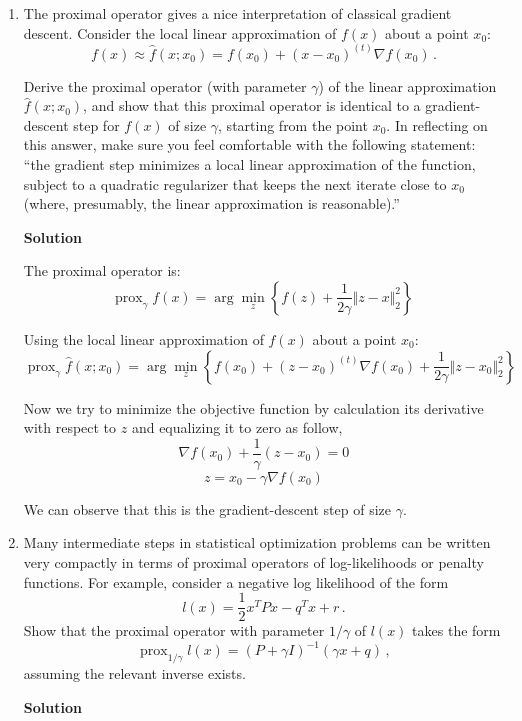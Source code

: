\documentclass[11 pt]{article}
\newcommand{\prox}{ \mathop{\mathrm{prox}} }
\newcommand{\enorm}[1]{\Vert #1 \Vert_2}
\begin{document}
	\begin{enumerate}[label=(\Alph*)]
		\item
		The proximal operator gives a nice interpretation of classical gradient descent.  Consider the local linear approximation of $f(x)$ about a point $x_0$:
		$$
		f(x) \approx \hat{f}(x; x_0) = f(x_0) + (x - x_0)^{(t)} \nabla f(x_0) \, .
		$$
		
		Derive the proximal operator (with parameter $\gamma$) of the linear approximation $\hat{f}(x; x_0)$, and show that this proximal operator is identical to a gradient-descent step for $f(x)$ of size $\gamma$, starting from the point $x_0$.  In reflecting on this answer, make sure you feel comfortable with the following statement: ``the gradient step minimizes a local linear approximation of the function, subject to a quadratic regularizer that keeps the next iterate close to $x_0$ (where, presumably, the linear approximation is reasonable).''
		
		\vspace{2mm}
		\textbf{Solution}
		
		The proximal operator is:
		$$
			\prox_{\gamma} f(x) = \arg \min_{z } \left\{  f(z)+ \frac{1}{2\gamma} \enorm{z - x}^2  \right\} \
		$$
		
		Using the local linear approximation of $f(x)$ about a point $x_0$:
		$$ 			\prox_{\gamma} \hat{f}(x; x_0) = \arg \min_{z } \left\{  f(x_0) + (z - x_0)^{(t)} \nabla f(x_0)+ \frac{1}{2\gamma} \enorm{z - x_0}^2  \right\} 	$$
		
		Now we try to minimize the objective function by calculation its derivative with respect to $z$ and equalizing it to zero as follow,
		$$			\nabla f(x_0) + \frac{1}{\gamma}(z-x_0) = 0 $$
		$$ z = x_0 - \gamma \nabla f(x_0) $$
		
		We can observe that this is  the gradient-descent step of size $\gamma$.


		
		\newpage
		\item Many intermediate steps in statistical optimization problems can be written very compactly in terms of proximal operators of log-likelihoods or penalty functions.  For example, consider a negative log likelihood of the form
		$$
		l(x) = \frac{1}{2} x^{T} P x - q^{T} x + r \, .
		$$
		Show that the proximal operator with parameter $1/\gamma$ of $l(x)$ takes the form
		$$
		\prox_{1/\gamma} l(x) = (P + \gamma I)^{-1} (\gamma  x + q) \, ,
		$$
		assuming the relevant inverse exists. 
		
		\vspace{2mm}
		\textbf{Solution}
		

\end{enumerate}
\end{document}
